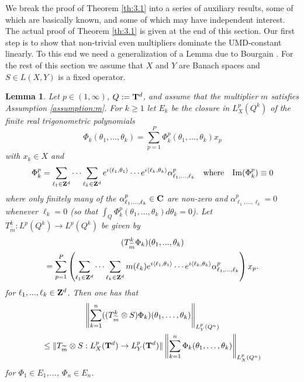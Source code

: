 \documentclass[11pt,a4paper,twoside,draft]{amsart}
\theoremstyle{definition}
\newcommand{\sptext}[3]{\hspace{#1 em}\mbox{#2}\hspace{#3 em}}
\newtheorem{lemma}{Lemma}[section]
\newcommand{\lem}[1]{\begin{lemma}\label{#1}\sl }
\newcommand{\elem}{\end{lemma}}
\newcommand{\integer}{{\bf Z}}
\newcommand{\complex}{{\bf C}}
\newcommand{\torus}{{\bf T}}
\DeclareMathOperator{\ba}{{\mathcal B\!\mathcal A}}
\begin{document}

We break the proof of Theorem \ref{th:3.1} into a series of auxiliary results,
some of which are basically known, and some of which may have independent interest.
The actual proof of Theorem \ref{th:3.1} is given at the end of this
section. Our first step is to show that non-trivial even multipliers dominate
the UMD-constant linearly. To this end we need a generalization 
of a Lemma due to
Bourgain  \cite[Lemma 1]{Bou}. For the rest of this section we assume that
$X$ and $Y$ are Banach spaces and  $S\in L(X,Y)$ is a fixed operator.
\bigskip

\lem{le:Bourgain_new}
Let  $p\in (1,\infty)$, $Q:=\torus^d$, and assume that the 
multiplier $m$ satisfies Assumption \ref{assumption:m}. For $k\ge 1$
let $E_k$ be the closure in $L^p_X(Q^k)$ of the finite real trigonometric 
polynomials
\[   \Phi_k(\theta_1,...,\theta_k) 
   = \sum_{p=1}^P  \Phi_k^p(\theta_1,...,\theta_k) x_p \]
with $x_k\in X$ and
\[   \Phi_k^p
   = \sum_{\ell_1\in\integer^d} \cdots \sum_{\ell_k\in\integer^d}
     e^{i \langle \ell_1,\theta_1 \rangle} \cdots
     e^{i \langle \ell_k,\theta_k \rangle} \alpha^p_{\ell_1,...,\ell_k} 
   \sptext{1}{where}{1}
   {\rm Im}(\Phi_k^p)\equiv 0 \]
where only finitely many of the $\alpha^p_{\ell_1,...,\ell_k}\in \complex$
are non-zero and 
$\alpha^p_{\ell_1,...,\ell_k} = 0$ whenever $\ell_k=0$ (so that
$\int_Q \Phi_k^p(\theta_1,...,\theta_k) d \theta_k = 0$).
Let
$T_{\widetilde{m}}^k: L^p(Q^k) \to L^p(Q^k)$ be given by
\begin{multline*}
     (T_{\widetilde{m}}^k \Phi_k)(\theta_1,...,\theta_k) \\
   = \sum_{p=1}^P \left (
     \sum_{\ell_1\in\integer^d} \cdots \sum_{\ell_k\in\integer^d}
     m(\ell_k)
     e^{i \langle \ell_1,\theta_1 \rangle} \cdots
     e^{i \langle \ell_k,\theta_k \rangle} \alpha^p_{\ell_1,...,\ell_k}
                   \right ) x_p.
\end{multline*}
for $\ell_1,...,\ell_k\in\integer^d$. 
Then one has that
\begin{multline*}%
     \left \| \sum_{k=1}^n 
     ((T_{\widetilde m}^k \otimes S) \Phi_k)(\theta_1,\ldots,\theta_k)
     \right \|_{L^p_Y(Q^n)} \\
\leq \| T_{\widetilde m}\otimes S: {L^p_X(\torus^d)\to L^p_Y(\torus^d)}  \|
     \left  \| \sum_{k=1}^n\Phi_k (\theta_1,\ldots,\theta_k)\right \|_{L^p_X(Q^n)}
\end{multline*}
for $\Phi_1\in E_1$,..., $\Phi_n\in E_n$.
\elem
\smallskip
\end{document}
